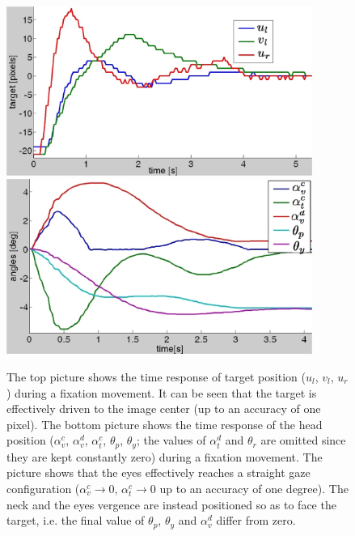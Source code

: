 \begin{figure}[!ht]
\centering
\includegraphics[width=100mm]{Figure/TimeResponseImage.eps}\\ \vspace{1cm}
\includegraphics[width=100mm]{Figure/TimeResponseEyesNeck.eps}
\caption{The top picture shows the time response of target position 
($u_l$, $v_l$, $u_r$) during a fixation movement. It can be seen 
that the target is effectively driven to the image center (up 
to an accuracy of one pixel). The bottom picture shows the time 
response of the head position ($\alpha_v^c$, $\alpha_v^d$, 
$\alpha_t^c$, $\theta_p$, $\theta_y$; the values of $\alpha_t^d$ 
and $\theta_r$ are omitted since they are kept constantly zero) 
during a fixation movement. The picture shows that the eyes 
effectively reaches a straight gaze configuration ($\alpha_v^c 
\rightarrow 0$, $\alpha_t^c \rightarrow 0$ up to an accuracy of one 
degree). The neck and the eyes vergence are instead positioned so 
as to face the target, i.e. the final value of $\theta_p$, 
$\theta_y$ and $\alpha_v^d$ differ from zero.}
\label{Fig:TimeResponse}
\end{figure}
